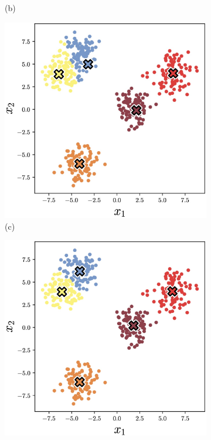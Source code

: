 \begin{figure}[t]
{\begin{subfigure}{0.25\textwidth}
            \caption*{(b)}
        \end{subfigure}%
        \hspace*{\fill}   %
        \begin{subfigure}{0.25\textwidth}
            \includegraphics[width=\linewidth]{figures/representation_learning/kmeans_ex_step3.jpg}
            \caption*{(c)}
        \end{subfigure}%
        \hspace*{\fill}   %
        \begin{subfigure}{0.25\textwidth}
            \includegraphics[width=\linewidth]{figures/representation_learning/kmeans_ex_step4.jpg}

\end{subfigure}}
\end{figure}
